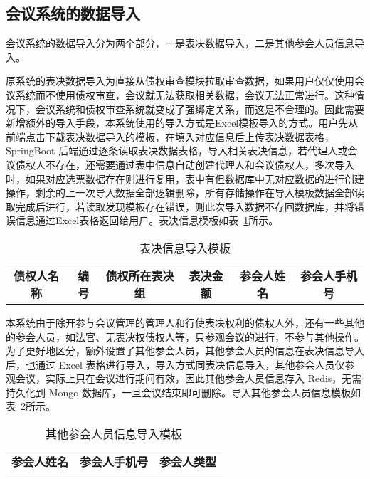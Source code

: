 \subsection{会议系统的数据导入}
会议系统的数据导入分为两个部分，一是表决数据导入，二是其他参会人员信息导入。

原系统的表决数据导入为直接从债权审查模块拉取审查数据，如果用户仅仅使用会议系统而不使用债权审查，会议就无法获取相关数据，会议无法正常进行。这种情况下，会议系统和债权审查系统就变成了强绑定关系，而这是不合理的。因此需要新增额外的导入手段，本系统使用的导入方式是Excel模板导入的方式。用户先从前端点击下载表决数据导入的模板，在填入对应信息后上传表决数据表格，SpringBoot 后端通过逐条读取表决数据表格，导入相关表决信息，若代理人或会议债权人不存在，还需要通过表中信息自动创建代理人和会议债权人，多次导入时，如果对应选票数据存在则进行复用，表中有但数据库中无对应数据的进行创建操作，剩余的上一次导入数据全部逻辑删除，所有存储操作在导入模板数据全部读取完成后进行，若读取发现模板存在错误，则此次导入数据不存回数据库，并将错误信息通过Excel表格返回给用户。表决信息模板如表~\ref{fig:meetingImport}所示。

\begin{table}[h!]
    \begin{center}
      \caption{表决信息导入模板}
      \label{fig:meetingImport}
      \begin{tabular}{|c|c|c|c|c|c|}
        \textbf{债权人名称} & \textbf{编号} & \textbf{债权所在表决组} & \textbf{表决金额} & \textbf{参会人姓名} & \textbf{参会人手机号}
      \end{tabular}
    \end{center}
  \end{table}

本系统由于除开参与会议管理的管理人和行使表决权利的债权人外，还有一些其他的参会人员，如法官、无表决权债权人等，只参观会议的进行，不参与其他操作。为了更好地区分，额外设置了其他参会人员，其他参会人员的信息在表决信息导入后，也通过 Excel 表格进行导入，导入方式同表决信息导入，其他参会人员仅参观会议，实际上只在会议进行期间有效，因此其他参会人员信息存入 Redis，无需持久化到 Mongo 数据库，一旦会议结束即可删除。导入其他参会人员信息模板如表~\ref{fig:otherUserImport}所示。

\begin{table}[h!]
    \begin{center}
      \caption{其他参会人员信息导入模板}
      \label{fig:otherUserImport}
      \begin{tabular}{|c|c|c|}
       \textbf{参会人姓名} & \textbf{参会人手机号} & \textbf{参会人类型}
      \end{tabular}
    \end{center}
  \end{table}

